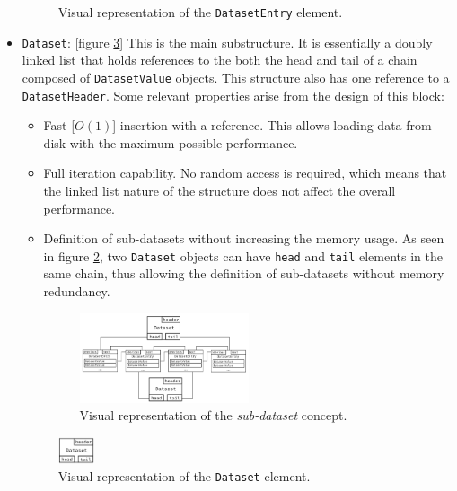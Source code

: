 \documentclass{acm_proc_article-sp}
\begin{document}
\begin{itemize}
\begin{figure}[h]
    \caption{Visual representation of the \texttt{DatasetEntry} element.}
    \label{fig:datasetentryblock}
  \end{figure}
  \item \texttt{Dataset}: [figure \ref{fig:datasetblock}] This is the main substructure. It is essentially a doubly linked list that holds references to the both the head and tail of a chain composed of \texttt{DatasetValue} objects. This structure also has one reference to a \texttt{DatasetHeader}. Some relevant properties arise from the design of this block:
  \begin{itemize}
    \item Fast [$O(1)$] insertion with a reference. This allows loading data from disk with the maximum possible performance.
    \item Full iteration capability. No random access is required, which means that the linked list nature of the structure does not affect the overall performance.
    \item Definition of sub-datasets without increasing the memory usage. As seen in figure \ref{fig:subdataset}, two \texttt{Dataset} objects can have \texttt{head} and \texttt{tail} elements in the same chain, thus allowing the definition of sub-datasets without memory redundancy.
    \begin{figure}[h]
      \centering
      \includegraphics[width=0.5\textwidth]{subdataset}
      \caption{Visual representation of the \textit{sub-dataset} concept.}
      \label{fig:subdataset}
    \end{figure}
  \end{itemize}
  \begin{figure}[h]
    \centering
    \includegraphics[width=0.10\textwidth]{datasetblock}
    \caption{Visual representation of the \texttt{Dataset} element.}
    \label{fig:datasetblock}
  \end{figure}
\end{itemize}
\end{document}
